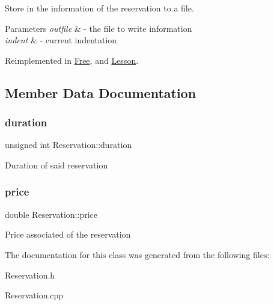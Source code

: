 Store in the information of the reservation to a file. 


\begin{DoxyParams}{Parameters}
{\em outfile} & -\/ the file to write information \\
\hline
{\em indent} & -\/ current indentation \\
\hline
\end{DoxyParams}


Reimplemented in \mbox{\hyperlink{class_free_a5eec9da16ebf4f388d16dd270bd93b64}{Free}}, and \mbox{\hyperlink{class_lesson_a645855060ab3c915a6e0875bc5584887}{Lesson}}.



\subsection{Member Data Documentation}
\mbox{\label{class_reservation_a1a311bb23edebfa226f9c744aefdc7b1}} 
\subsubsection{\texorpdfstring{duration}{duration}}
{\footnotesize\ttfamily unsigned int Reservation\+::duration\hspace{0.3cm}{\ttfamily [protected]}}

Duration of said reservation \mbox{\label{class_reservation_a82e197bd30e7949ee9b8616ee4eacf83}} 
\subsubsection{\texorpdfstring{price}{price}}
{\footnotesize\ttfamily double Reservation\+::price\hspace{0.3cm}{\ttfamily [protected]}}

Price associated of the reservation 

The documentation for this class was generated from the following files\+:\begin{DoxyCompactItemize}
\item 
Reservation.\+h\item 
Reservation.\+cpp\end{DoxyCompactItemize}
